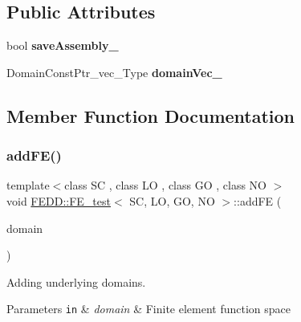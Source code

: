 \subsection*{Public Attributes}
\begin{DoxyCompactItemize}
\item 
\mbox{\label{classFEDD_1_1FE__test_a409153b295bfaedbb731360429ae8c0d}} 
bool {\bfseries save\+Assembly\+\_\+}
\item 
\mbox{\label{classFEDD_1_1FE__test_a39e2d4cf2b368fdb0280596a064e8212}} 
Domain\+Const\+Ptr\+\_\+vec\+\_\+\+Type {\bfseries domain\+Vec\+\_\+}
\end{DoxyCompactItemize}


\subsection{Member Function Documentation}
\mbox{\label{classFEDD_1_1FE__test_a9bc8d2dd017116bfb6921a1f63fe458a}} 
\subsubsection{\texorpdfstring{add\+F\+E()}{addFE()}}
{\footnotesize\ttfamily template$<$class SC , class LO , class GO , class NO $>$ \\
void \hyperlink{classFEDD_1_1FE__test}{F\+E\+D\+D\+::\+F\+E\+\_\+test}$<$ SC, LO, GO, NO $>$\+::add\+FE (\begin{DoxyParamCaption}\item[{Domain\+Const\+Ptr\+\_\+\+Type}]{domain }\end{DoxyParamCaption})}



Adding underlying domains. 


\begin{DoxyParams}[1]{Parameters}
\mbox{\tt in}  & {\em domain} & Finite element function space \\
\hline
\end{DoxyParams}
\mbox{\label{classFEDD_1_1FE__test_ac3a835c3218131847be6962a0e256fb2}} 
